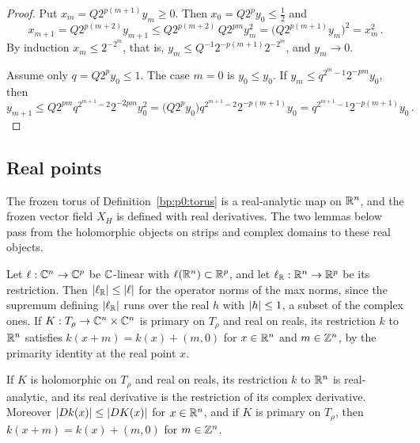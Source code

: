 \begin{proof}
\label{step:p1:it-super}
Put $x_m=Q2^{p(m+1)}y_m\ge0$. Then $x_0=Q2^py_0\le\frac12$ and
\begin{equation*}
x_{m+1}=Q2^{p(m+2)}y_{m+1}\le Q2^{p(m+2)}\,Q2^{pm}y_m^2=\bigl(Q2^{p(m+1)}y_m\bigr)^2=x_m^2\,.
\end{equation*}
By induction $x_m\le2^{-2^m}$, that is, $y_m\le Q^{-1}2^{-p(m+1)}2^{-2^m}$, and $y_m\to0$.

\label{step:p1:it-linear}
Assume only $q=Q2^py_0\le1$. The case $m=0$ is $y_0\le y_0$. If $y_m\le q^{2^m-1}2^{-pm}y_0$, then
\begin{equation*}
y_{m+1}\le Q2^{pm}q^{2^{m+1}-2}2^{-2pm}y_0^2=\bigl(Q2^py_0\bigr)q^{2^{m+1}-2}2^{-p(m+1)}y_0
=q^{2^{m+1}-1}2^{-p(m+1)}y_0\,.
\end{equation*}
\end{proof}

\subsection{Real points}\label{bp:p1:sec-real}

The frozen torus of Definition~\ref{bp:p0:torus} is a real-analytic map on $\mathbb{R}^n$, and the frozen vector
field $X_H$ is defined with real derivatives. The two lemmas below pass from the holomorphic objects on
strips and complex domains to these real objects.

\begin{remark}\label{bp:p1:real-restriction-consequences}
Let $\ell:\mathbb{C}^n\to\mathbb{C}^p$ be $\mathbb{C}$-linear with $\ell(\mathbb{R}^n)\subset\mathbb{R}^p$, and let $\ell_{\mathbb{R}}:\mathbb{R}^n\to\mathbb{R}^p$ be its
restriction. Then $\lvert \ell_{\mathbb{R}}\rvert\le\lvert \ell\rvert$ for the operator norms of the max norms, since the supremum
defining $\lvert \ell_{\mathbb{R}}\rvert$ runs over the real $h$ with $\lvert h\rvert\le1$, a subset of the complex ones. If
$K:T_\rho\to\mathbb{C}^n\times\mathbb{C}^n$ is primary on $T_\rho$ and real on reals, its restriction $k$ to $\mathbb{R}^n$ satisfies
$k(x+m)=k(x)+(m,0)$ for $x\in\mathbb{R}^n$ and $m\in\mathbb{Z}^n$, by the primarity identity at the real point $x$.
\end{remark}

\begin{lemma}\label{bp:p1:real-restriction}
If $K$ is holomorphic on $T_\rho$ and real on reals, its restriction $k$ to $\mathbb{R}^n$ is real-analytic, and its real
derivative is the restriction of its complex derivative. Moreover $\lvert Dk(x)\rvert\le\lvert DK(x)\rvert$ for
$x\in\mathbb{R}^n$, and if $K$ is primary on $T_\rho$, then $k(x+m)=k(x)+(m,0)$ for $m\in\mathbb{Z}^n$.
\end{lemma}

